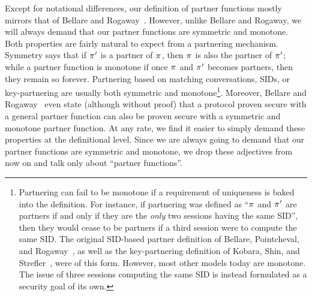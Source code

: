 Except for notational differences,
our definition of partner functions mostly mirrors that of Bellare and Rogaway~\cite{STOC:BelRog95}.
However,
unlike Bellare and Rogaway,
we will always demand that our partner functions are symmetric and monotone.
Both properties are fairly natural to expect from a partnering mechanism.
Symmetry says that if $\oracle'$ is a partner of $\oracle$,
then $\oracle$ is also the partner of $\oracle'$;
while a partner function is monotone if once $\oracle$ and $\oracle'$ becomes partners,
then they remain so forever.
Partnering based on matching conversations,
SIDs,
or key-partnering are usually both symmetric and monotone\footnote{Partnering 
can fail to be monotone if a requirement of uniqueness is baked into the definition.
For instance,
if partnering was defined as ``$\oracle$ and $\oracle'$ are partners if and only if they are the \emph{only} two sessions having the same SID'',
then they would cease to be partners if a third session were to compute the same SID.
The original SID-based partner definition of Bellare, Pointcheval, and Rogaway~\cite{EC:BelPoiRog00},
as well as the key-partnering definition of Kobara, Shin, and Strefler~\cite{ASIACCS:KobShiStr09},
were of this form.
However,
most other models today are monotone.
The issue of three sessions computing the same SID is instead formulated as a security goal of its own.
}.
Moreover,
Bellare and Rogaway~\cite[Thm~5]{STOC:BelRog95} even state (although without proof) 
that a protocol proven secure with a general partner function can also be proven secure with a symmetric and monotone partner function.
At any rate,
we find it easier to simply demand these properties at the definitional level.
Since we are always going to demand that our partner functions are symmetric and monotone,
we drop these adjectives from now on and talk only about ``partner functions''.




